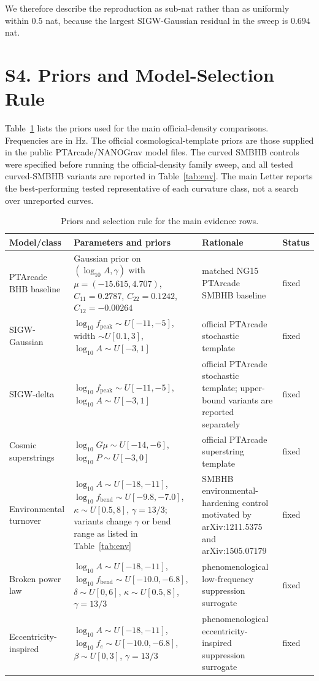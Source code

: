 \documentclass[aps,prl,superscriptaddress,nofootinbib]{revtex4-2}
\begin{document}
We therefore describe the reproduction as sub-nat rather than as uniformly
within $0.5$ nat, because the largest SIGW-Gaussian residual in the sweep is
$0.694$ nat.

\section*{S4. Priors and Model-Selection Rule}

Table~\ref{tab:priors} lists the priors used for the main official-density
comparisons.  Frequencies are in Hz.  The official cosmological-template priors
are those supplied in the public PTArcade/NANOGrav model files.  The curved
SMBHB controls were specified before running the official-density family sweep,
and all tested curved-SMBHB variants are reported in Table~\ref{tab:env}.  The
main Letter reports the best-performing tested representative of each
curvature class, not a search over unreported curves.

\begin{table}[H]
\caption{\label{tab:priors}Priors and selection rule for the main evidence rows.}
\begin{ruledtabular}
\begin{tabular}{p{}p{}p{}p{}}
Model/class & Parameters and priors & Rationale & Status \\
\hline
PTArcade BHB baseline & Gaussian prior on $(\log_{10}A,\gamma)$ with
$\mu=(-15.615,4.707)$, $C_{11}=0.2787$, $C_{22}=0.1242$,
$C_{12}=-0.00264$ & matched NG15 PTArcade SMBHB baseline & fixed \\
SIGW-Gaussian & $\log_{10}f_\mathrm{peak}\sim U[-11,-5]$,
width $\sim U[0.1,3]$, $\log_{10}A\sim U[-3,1]$ & official PTArcade
stochastic template & fixed \\
SIGW-delta & $\log_{10}f_\mathrm{peak}\sim U[-11,-5]$,
$\log_{10}A\sim U[-3,1]$ & official PTArcade stochastic template;
upper-bound variants are reported separately & fixed \\
Cosmic superstrings & $\log_{10}G\mu\sim U[-14,-6]$,
$\log_{10}P\sim U[-3,0]$ & official PTArcade superstring template & fixed \\
Environmental turnover & $\log_{10}A\sim U[-18,-11]$,
$\log_{10}f_\mathrm{bend}\sim U[-9.8,-7.0]$,
$\kappa\sim U[0.5,8]$, $\gamma=13/3$; variants change $\gamma$ or bend
range as listed in Table~\ref{tab:env} & SMBHB environmental-hardening
control motivated by arXiv:1211.5375 and arXiv:1505.07179 & fixed \\
Broken power law & $\log_{10}A\sim U[-18,-11]$,
$\log_{10}f_\mathrm{bend}\sim U[-10.0,-6.8]$,
$\delta\sim U[0,6]$, $\kappa\sim U[0.5,8]$, $\gamma=13/3$ &
phenomenological low-frequency suppression surrogate & fixed \\
Eccentricity-inspired & $\log_{10}A\sim U[-18,-11]$,
$\log_{10}f_e\sim U[-10.0,-6.8]$, $\beta\sim U[0,3]$,
$\gamma=13/3$ & phenomenological eccentricity-inspired suppression
surrogate & fixed \\
\end{tabular}
\end{ruledtabular}
\end{table}
\end{document}
